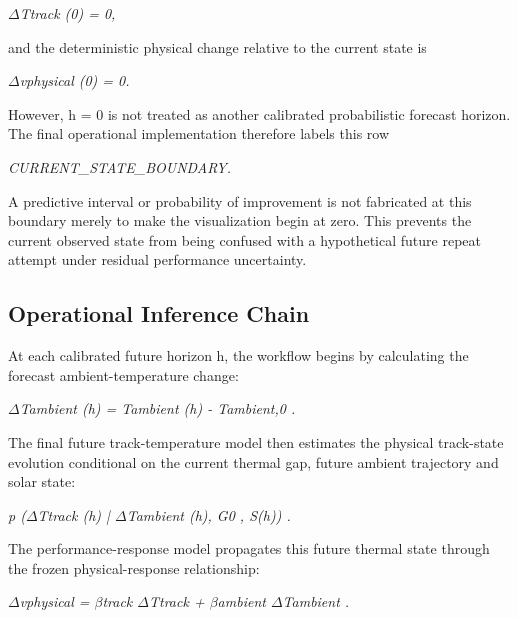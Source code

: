 \begin{center}\textit{\ensuremath{\Delta}Ttrack (0) = 0,}\end{center}

and the deterministic physical change relative to the current state is

\begin{center}\textit{\ensuremath{\Delta}vphysical (0) = 0.}\end{center}

However, h = 0 is not treated as another calibrated probabilistic forecast horizon. The final operational implementation therefore labels this row

\begin{center}\textit{CURRENT\_STATE\_BOUNDARY.}\end{center}

A predictive interval or probability of improvement is not fabricated at this boundary merely to make the visualization begin at zero. This prevents the current observed state from being confused with a hypothetical future repeat attempt under residual performance uncertainty.

\subsection{Operational Inference Chain}
At each calibrated future horizon h, the workflow begins by calculating the forecast ambient-temperature change:

\begin{center}\textit{\ensuremath{\Delta}Tambient (h) = Tambient (h) - Tambient,0 .}\end{center}

The final future track-temperature model then estimates the physical track-state evolution conditional on the current thermal gap, future ambient trajectory and solar state:

\begin{center}\textit{p (\ensuremath{\Delta}Ttrack (h) | \ensuremath{\Delta}Tambient (h), G0 , S(h)) .}\end{center}

The performance-response model propagates this future thermal state through the frozen physical-response relationship:

\begin{center}\textit{\ensuremath{\Delta}vphysical = \ensuremath{\beta}track \ensuremath{\Delta}Ttrack + \ensuremath{\beta}ambient \ensuremath{\Delta}Tambient .}\end{center}

